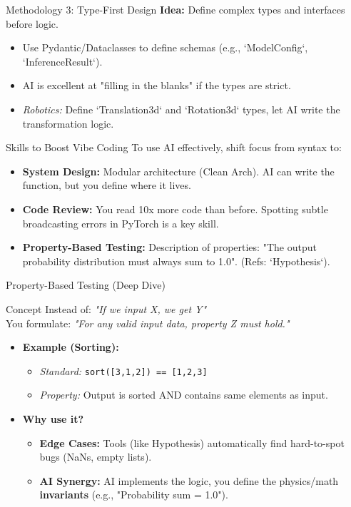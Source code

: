 \documentclass[aspectratio=169]{beamer}
\begin{document}
\begin{frame}[t]{Methodology 3: Type-First Design}
    \textbf{Idea:} Define complex types and interfaces before logic.
    \begin{itemize}
        \item Use Pydantic/Dataclasses to define schemas (e.g., `ModelConfig`, `InferenceResult`).
        \item AI is excellent at "filling in the blanks" if the types are strict.
        \item \textit{Robotics:} Define `Translation3d` and `Rotation3d` types, let AI write the transformation logic.
    \end{itemize}
\end{frame}

\begin{frame}[t]{Skills to Boost Vibe Coding}
    To use AI effectively, shift focus from syntax to:
    \begin{itemize}
        \item \textbf{System Design:} Modular architecture (Clean Arch). AI can write the function, but you define where it lives.
        \item \textbf{Code Review:} You read 10x more code than before. Spotting subtle broadcasting errors in PyTorch is a key skill.
        \item \textbf{Property-Based Testing:} Description of properties: "The output probability distribution must always sum to 1.0". (Refs: `Hypothesis`).
    \end{itemize}
\end{frame}

\begin{frame}[t]{Property-Based Testing (Deep Dive)}
    \begin{block}{Concept}
        Instead of: \textit{"If we input X, we get Y"} \\
        You formulate: \textit{"For any valid input data, property Z must hold."}
    \end{block}
    
    \begin{itemize}
        \item \textbf{Example (Sorting):}
        \begin{itemize}
            \item \textit{Standard:} \texttt{sort([3,1,2]) == [1,2,3]}
            \item \textit{Property:} Output is sorted AND contains same elements as input.
        \end{itemize}
        \item \textbf{Why use it?}
        \begin{itemize}
            \item \textbf{Edge Cases:} Tools (like Hypothesis) automatically find hard-to-spot bugs (NaNs, empty lists).
            \item \textbf{AI Synergy:} AI implements the logic, you define the physics/math \textbf{invariants} (e.g., "Probability sum = 1.0").
        \end{itemize}
    \end{itemize}
\end{frame}
\end{document}
